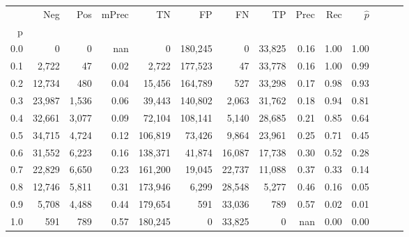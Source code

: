 \begin{tabular}{rrrrrrrrrrrrrr}
\toprule
{} &     Neg &    Pos & mPrec &       TN &       FP &      FN &      TP &  Prec &   Rec & $\hat{p}$ \\
p   &         &        &       &          &          &         &         &       &       &           \\
\midrule
0.0 &       0 &      0 &   nan &        0 &  180,245 &       0 &  33,825 &  0.16 &  1.00 &      1.00 \\
0.1 &   2,722 &     47 &  0.02 &    2,722 &  177,523 &      47 &  33,778 &  0.16 &  1.00 &      0.99 \\
0.2 &  12,734 &    480 &  0.04 &   15,456 &  164,789 &     527 &  33,298 &  0.17 &  0.98 &      0.93 \\
0.3 &  23,987 &  1,536 &  0.06 &   39,443 &  140,802 &   2,063 &  31,762 &  0.18 &  0.94 &      0.81 \\
0.4 &  32,661 &  3,077 &  0.09 &   72,104 &  108,141 &   5,140 &  28,685 &  0.21 &  0.85 &      0.64 \\
0.5 &  34,715 &  4,724 &  0.12 &  106,819 &   73,426 &   9,864 &  23,961 &  0.25 &  0.71 &      0.45 \\
0.6 &  31,552 &  6,223 &  0.16 &  138,371 &   41,874 &  16,087 &  17,738 &  0.30 &  0.52 &      0.28 \\
0.7 &  22,829 &  6,650 &  0.23 &  161,200 &   19,045 &  22,737 &  11,088 &  0.37 &  0.33 &      0.14 \\
0.8 &  12,746 &  5,811 &  0.31 &  173,946 &    6,299 &  28,548 &   5,277 &  0.46 &  0.16 &      0.05 \\
0.9 &   5,708 &  4,488 &  0.44 &  179,654 &      591 &  33,036 &     789 &  0.57 &  0.02 &      0.01 \\
1.0 &     591 &    789 &  0.57 &  180,245 &        0 &  33,825 &       0 &   nan &  0.00 &      0.00 \\
\bottomrule
\end{tabular}
